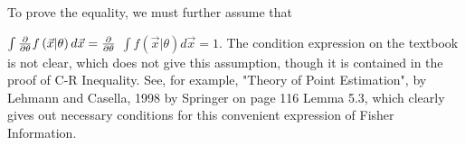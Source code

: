\documentclass{article}
\begin{document}
To prove the equality, we must further assume that 

$\int \frac{\partial }{\partial \theta }f\left( \vec{x}|\theta \right) d\vec{%
x}=\frac{\partial }{\partial \theta }$ $\int f\left( \vec{x}|\theta \right) d%
\vec{x}=1.$ The condition expression on the textbook is
not clear, which does not give this assumption, though it is contained in
the proof of C-R Inequality. See, for example, "Theory of Point Estimation",
by Lehmann
and Casella, 1998 by Springer on page 116 Lemma 5.3, which clearly gives out
necessary conditions for this convenient expression of Fisher Information.

\end{document}
